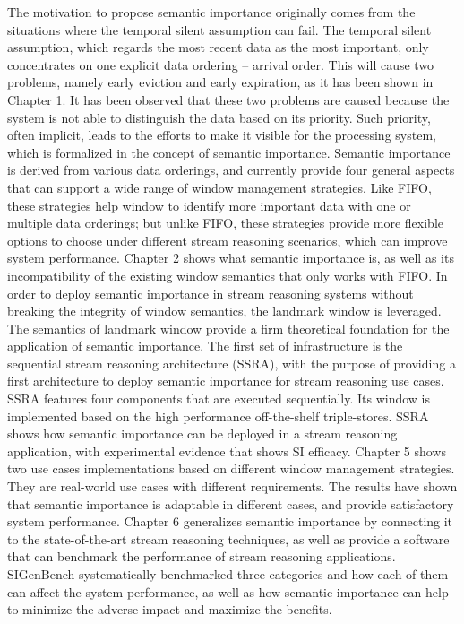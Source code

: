 The motivation to propose semantic importance originally comes from the situations where the temporal silent assumption can fail.
The temporal silent assumption, which regards the most recent data as the most important, only concentrates on one explicit data ordering -- arrival order. 
This will cause two problems, namely early eviction and early expiration, as it has been shown in Chapter 1.
It has been observed that these two problems are caused because the system is not able to distinguish the data based on its priority. 
Such priority, often implicit, leads to the efforts to make it visible for the processing system, which is formalized in the concept of semantic importance.
Semantic importance is derived from various data orderings, and currently provide four general aspects that can support a wide range of window management strategies.
Like FIFO, these strategies help window to identify more important data with one or multiple data orderings; but unlike FIFO, these strategies provide more flexible options to choose under different stream reasoning scenarios, which can improve system performance.
Chapter 2 shows what semantic importance is, as well as its incompatibility of the existing window semantics that only works with FIFO.
In order to deploy semantic importance in stream reasoning systems without breaking the integrity of window semantics, the landmark window is leveraged.
The semantics of landmark window provide a firm theoretical foundation for the application of semantic importance. 
The first set of infrastructure is the sequential stream reasoning architecture (SSRA), with the purpose of providing a first architecture to deploy semantic importance for stream reasoning use cases. 
SSRA features four components that are executed sequentially. 
Its window is implemented based on the high performance off-the-shelf triple-stores. 
SSRA shows how semantic importance can be deployed in a stream reasoning application, with experimental evidence that shows SI efficacy. 
Chapter 5 shows two use cases implementations based on different window management strategies.
They are real-world use cases with different requirements.
The results have shown that semantic importance is adaptable in different cases, and provide satisfactory system performance. 
Chapter 6 generalizes semantic importance by connecting it to the state-of-the-art stream reasoning techniques, as well as provide a software that can benchmark the performance of stream reasoning applications.
SIGenBench systematically benchmarked three categories and how each of them can affect the system performance, as well as how semantic importance can help to minimize the adverse impact and maximize the benefits. 

